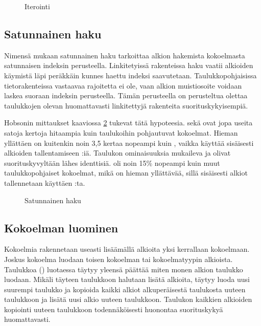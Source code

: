 \begin{figure}[h]
    \centering
    
    \caption{Iterointi}\label{iterointi_kaavio}
\end{figure}


\subsection{Satunnainen haku}
Nimensä mukaan satunnainen haku tarkoittaa alkion hakemista kokoelmasta satunnaisen indeksin perusteella. Linkitetyissä rakenteissa haku vaatii alkioiden käymistä läpi peräkkäin kunnes haettu indeksi saavutetaan. Taulukkopohjaisissa tietorakenteissa vastaavaa rajoitetta ei ole, vaan alkion muistiosoite voidaan laskea suoraan indeksin perusteella. Tämän perusteella on perusteltua olettaa taulukkojen olevan huomattavasti linkitettyjä rakenteita suorituskykyisempiä.

Hobsonin mittaukset kaaviossa \ref{satunnainenHaku_kaavio} tukevat tätä hypoteesia.  sekä  ovat jopa useita satoja kertoja hitaampia kuin taulukoihin pohjautuvat kokoelmat. Hieman yllättäen  on kuitenkin noin 3,5 kertaa nopeampi kuin , vaikka  käyttää sisäisesti alkioiden tallentamiseen :iä. Taulukon ominaisuuksia mukaileva  ja  olivat suorituskyvyltään lähes identtisiä.  oli noin 15\% nopeampi kuin muut taulukkopohjaiset kokoelmat, mikä on hieman yllättävää, sillä sisäisesti alkiot tallennetaan käyttäen :ta.

\begin{figure}[h]
    \centering
    
    \caption{Satunnainen haku}\label{satunnainenHaku_kaavio}
\end{figure}


\subsection{Kokoelman luominen}
Kokoelmia rakennetaan useasti lisäämällä alkioita yksi kerrallaan kokoelmaan. Joskus kokoelma luodaan toisen kokoelman tai kokoelmatyypin alkioista. Taulukkoa () luotaessa täytyy yleensä päättää miten monen alkion taulukko luodaan. Mikäli täyteen taulukkoon halutaan lisätä alkioita, täytyy luoda uusi suurempi taulukko ja kopioida kaikki alkiot alkuperäisestä taulukosta uuteen taulukkoon ja lisätä uusi alkio uuteen taulukkoon. Taulukon kaikkien alkioiden kopiointi uuteen taulukkoon todennäköisesti huonontaa suorituskykyä huomattavasti.

